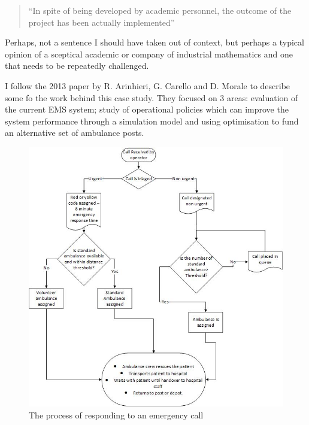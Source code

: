 \documentclass[11pt]{article} %
\begin{document}
	\begin{quote}
		``In spite of being developed by academic personnel, the outcome of the project has been actually implemented''
	\end{quote}

	Perhaps, not a sentence I should have taken out of context, but perhaps a typical  opinion of a sceptical academic or company of industrial mathematics and one that needs to be repeatedly challenged.
	

	I follow the 2013 paper by R. Arinhieri, G. Carello and D. Morale \cite{Carello2013}  to describe some fo the work behind this case study.	They focused on 3 areas: evaluation of the current EMS system; study of operational policies which can improve the system performance through a simulation model and using optimisation to fund an alternative set of ambulance posts. 
	\begin{figure}
		\centering
		\includegraphics[width=\linewidth]{Report_images/MilanEMS}
		\caption{The process of responding to an emergency call}
		\label{fig:milanems}
	\end{figure}
\end{document}
